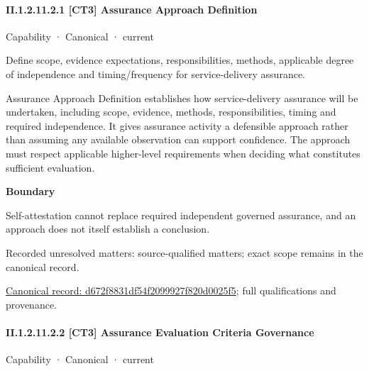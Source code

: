 \paragraph*{II.1.2.11.2.1 [CT3] Assurance Approach Definition}
\label{navigation:II.1.2.11.2.1}

\label{element:d672f8831df54f2099927f820d0025f5}
{\small Capability · Canonical · current}\par

Define scope, evidence expectations, responsibilities, methods, applicable degree of independence and timing/frequency for service-delivery assurance.



Assurance Approach Definition establishes how service-delivery assurance will be undertaken, including scope, evidence, methods, responsibilities, timing and required independence. It gives assurance activity a defensible approach rather than assuming any available observation can support confidence. The approach must respect applicable higher-level requirements when deciding what constitutes sufficient evaluation.



\textbf{Boundary}



Self-attestation cannot replace required independent governed assurance, and an approach does not itself establish a conclusion.


{\small Recorded unresolved matters: source-qualified matters; exact scope remains in the canonical record.}\par
{\footnotesize \href{../../../../continuum/strategy/capability/d672f8831df54f2099927f820d0025f5.md}{Canonical record: d672f8831df54f2099927f820d0025f5}; full qualifications and provenance.}\par
\paragraph*{II.1.2.11.2.2 [CT3] Assurance Evaluation Criteria Governance}
\label{navigation:II.1.2.11.2.2}

\label{element:f3e32f2a2c9d47a89eaf124647161522}
{\small Capability · Canonical · current}\par

